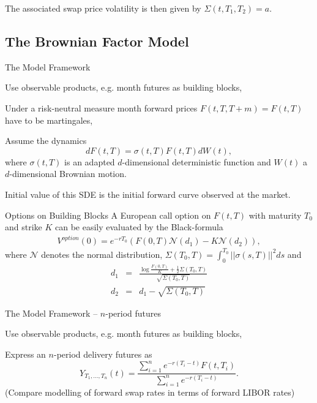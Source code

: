 The associated swap price volatility is then given by $\Sigma(t,T_1,T_2)=a$.




\subsection{The Brownian Factor Model}


{The Model Framework}






	Use observable products, e.g. month futures as building blocks,


	Under a risk-neutral measure month forward prices $F(t,T,T+m)=F(t,T)$ have to be martingales,


	Assume the dynamics
$$dF(t,T)=\sigma(t,T)F(t,T)dW(t),$$
where $\sigma(t,T)$ is an adapted $d$-dimensional deterministic function and
$W(t)$ a $d$-dimensional Brownian motion.


	Initial value of this SDE is the initial forward curve observed at the market.







{Options on Building Blocks}
A European call option on $F(t,T)$ with maturity $T_0$ and strike
$K$ can be easily evaluated by the Black-formula
\begin{eqnarray}\label{eq:month-option}
V^{option}(0)=e^{-rT_0}\left(F(0,T)\mathcal{N}(d_1)-K\mathcal{N} (d_2)\right),
\end{eqnarray}
where $\mathcal{N}$ denotes the normal distribution, $\Sigma(T_0,T)=\int_0^{T_0}||\sigma(s,T)||^2ds$ and
\begin{eqnarray*}
d_1& = & \frac{\log \frac{F(0,T)}{K}+\frac{1}{2}\Sigma(T_0,T)}{\sqrt{\Sigma(T_0,T)}}\\
d_2 & = & d_1 - \sqrt{\Sigma(T_0,T)}
\end{eqnarray*}




{The Model Framework -- $n$-period futures}






	Use observable products, e.g. month futures as building blocks,


	Express an $n$-period delivery futures as
$$Y_{T_1, \ldots, T_n}(t)=\frac{\sum_{i=1}^n e^{-r(T_i-t)}F(t,T_i)}{\sum_{i=1}^n e^{-r(T_i-t)}}.$$
(Compare modelling of forward swap rates in terms of forward LIBOR rates)


